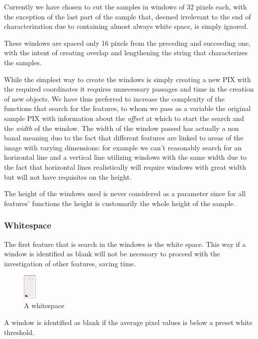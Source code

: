 Currently we have chosen to cut the samples in windows of 32 pixels each, with the exception of the last part of the sample that, deemed irrelevant to the end of characterization due to containing almost always white space, is simply ignored.

These windows are spaced only 16 pixels from the preceding and succeeding one, with the intent of creating overlap and lengthening the string that characterizes the samples.

While the simplest way to create the windows is simply creating a new PIX with the required coordinates it requires unnecessary passages and time in the creation of new objects. We have thus preferred to increase the complexity of the functions that search for the features, to whom we pass as a variable the original sample PIX with information about the \textit{offset} at which to start the search and the \textit{width} of the window. The width of the window passed has actually a non banal meaning duo to the fact that different features are linked to areas of the image with varying dimensions: for example we can't reasonably search for an horizontal line and a vertical line utilizing windows with the same width due to the fact that horizontal lines realistically will require windows with great width but will not have requisites on the height.

The height of the windows used is never considered as a parameter since for all features' functions the height is customarily the whole height of the sample.  

\subsubsection{Whitespace}  

The first feature that is search in the windows is the white space. This way if a window is identified as blank will not be necessary to proceed with the investigation of other features, saving time.

\begin{figure}[!ht]
\centering
\includegraphics[width=0.06\textwidth]{images/whitespace.jpg}
\caption{A whitespace}
\end{figure} 

A window is identified as blank if the average pixel values is below a preset white threshold.

